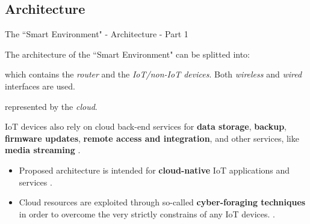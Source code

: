 \documentclass[10pt]{beamer}
\begin{document}
\subsection{Architecture}
\begin{frame}{The ``Smart Environment" - Architecture - Part 1}

The architecture of the ``Smart Environment"  can be splitted into:

\begin{description}
\justifying
\item[\textbf{Front-end}] which contains the \textit{router} and the \textit{IoT/non-IoT devices}. Both \textit{wireless} and \textit{wired} interfaces are used.

\item[\textbf{Back-end}] represented by the \textit{cloud}. 

IoT devices also rely on cloud back-end services for \textbf{data storage}, \textbf{backup}, \textbf{firmware updates}, \textbf{remote access and integration}, and other services, like \textbf{media streaming} \cite{mazhar2020characterizing}.

\end{description}

\begin{block}{}
\justifying
\begin{itemize}

\item Proposed architecture is intended for \textbf{cloud-native} IoT applications and services \cite{TheSeminalRoleEdgeNativeApplications}.

\item Cloud resources are exploited through so-called \textbf{cyber-foraging techniques} in order to overcome the very strictly constrains of any IoT devices. \cite{TheSeminalRoleEdgeNativeApplications}.

\end{itemize}
 
\end{block}

\end{frame} 
\end{document}
